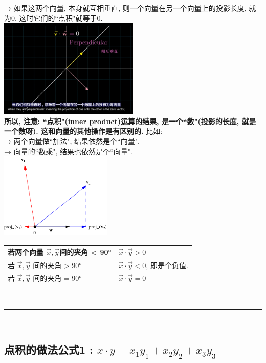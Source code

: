 \documentclass[UTF8]{ctexart}
\begin{document}
→ 如果这两个向量, 本身就互相垂直, 则一个向量在另一个向量上的投影长度, 就为0. 这时它们的``点积"就等于0.\\
\includegraphics[width=0.5\textwidth]{img/0093.png}\\



\textbf{所以, 注意: ``点积"(inner product)运算的结果, 是一个``数"(投影的长度, 就是一个数呀). 这和向量的其他操作是有区别的.} 比如:  \\
→ 两个向量做``加法", 结果依然是个``向量". \\
→ 向量的``数乘", 结果也依然是个``向量".\\

\includegraphics[width=0.4\textwidth]{img/0094.png} \\


\begin{tabular}{|l|l|}
	\hline
	若两个向量 $\vec{x}, \vec{y} $间的夹角 < 90° & $\vec{x} \cdot \vec{y} > 0$              \\
	\hline
	若 $\vec{x}, \vec{y}$ 间的夹角 > 90°         & $\vec{x} \cdot \vec{y} < 0$, 即是个负值. \\
	\hline
	若 $\vec{x}, \vec{y}$ 间的夹角 = 90°         & $\vec{x} \cdot \vec{y} = 0$              \\
	\hline
\end{tabular}





~\\
\hrule
~\\

\subsection{点积的做法公式1 : $ x\cdot y = x_1 y_{1} + x_2 y_{2} + x_{3}y_{3}$}
\end{document}

